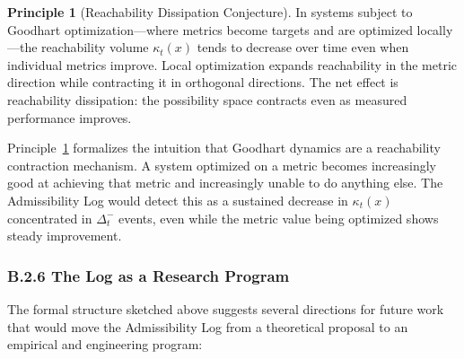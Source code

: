 \documentclass[12pt, a4paper]{article}
\theoremstyle{plain}
\theoremstyle{definition}
\newtheorem{principle}[theorem]{Principle}
\theoremstyle{remark}
\begin{document}
\begin{principle}[Reachability Dissipation Conjecture]
\label{prin:dissip}
In systems subject to Goodhart optimization---where metrics become targets
and are optimized locally---the reachability volume $\kappa_t(x)$ tends to
decrease over time even when individual metrics improve. Local optimization
expands reachability in the metric direction while contracting it in
orthogonal directions. The net effect is reachability dissipation: the
possibility space contracts even as measured performance improves.
\end{principle}

Principle~\ref{prin:dissip} formalizes the intuition that Goodhart dynamics
are a reachability contraction mechanism. A system optimized on a metric
becomes increasingly good at achieving that metric and increasingly unable
to do anything else. The Admissibility Log would detect this as a sustained
decrease in $\kappa_t(x)$ concentrated in $\Delta_t^-$ events, even while
the metric value being optimized shows steady improvement.

\subsubsection*{B.2.6 The Log as a Research Program}

The formal structure sketched above suggests several directions for future
work that would move the Admissibility Log from a theoretical proposal to an
empirical and engineering program:
\end{document}
